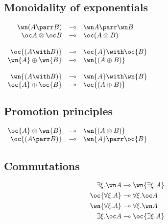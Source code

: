 \subsection{Monoidality of
exponentials}\label{monoidality-of-exponentials}

\(\begin{array}{rcl}
  \wn(A\parr B) & \limp&  \wn A\parr\wn B \\
  \oc A\tens\oc B & \limp&  \oc(A\tens B) \\
\\
 \oc{(A \with B)} & \limp&  \oc{A} \with \oc{B} \\
 \wn{A} \plus \wn{B} & \limp&  \wn{(A \plus B)} \\
\\
 \wn{(A \with B)} & \limp&  \wn{A} \with \wn{B} \\
 \oc{A} \plus \oc{B} & \limp&  \oc{(A \plus B)}
\end{array}\)

\subsection{Promotion principles}\label{promotion-principles}

\(\begin{array}{rcl}
 \oc{A} \tens \wn{B} & \limp&  \wn{(A \tens B)} \\
 \oc{(A \parr B)} & \limp&  \wn{A} \parr \oc{B}
\end{array}\)

\subsection{Commutations}\label{commutations}
\begin{align*}
\exists \xi . \wn A &\limp \wn{\exists \xi . A} \\
\oc{\forall \xi . A} &\limp \forall \xi . \oc A \\
\wn{\forall \xi . A} &\limp \forall \xi . \wn A \\
\exists \xi . \oc A &\limp \oc{\exists \xi . A}
\end{align*}


